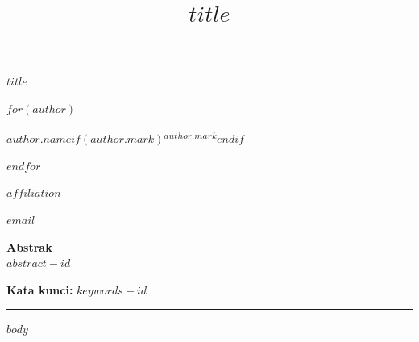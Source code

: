 \documentclass[11pt,a4paper]{article}
\title{\vspace{-1.2cm}\bfseries $title$}
\author{}
\date{}
\begin{document}
{
\begin{center}
{\Large\bfseries $title$\par}
\vspace{0.5cm}
$for(author)$
{\normalsize\bfseries $author.name$$if(author.mark)$\textsuperscript{$author.mark$}$endif$\par}
$endfor$
\vspace{0.2cm}
{\small\itshape $affiliation$\par}
{\small $email$\par}
\end{center}
}
\vspace{0.3cm}

\begin{center}
\begin{minipage}{0.92\textwidth}
\small
\noindent\textbf{Abstrak}\\[2pt]
$abstract-id$

\vspace{4pt}
\noindent\textbf{Kata kunci:} \emph{$keywords-id$}
\end{minipage}
\end{center}
\vspace{0.4cm}
\hrule
\vspace{0.4cm}

$body$
\end{document}
